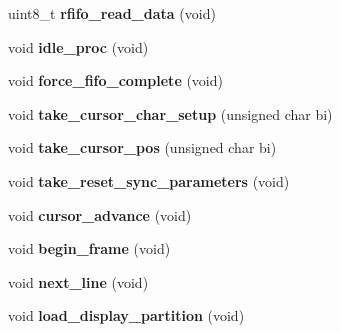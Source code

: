 \begin{DoxyCompactItemize}
\item 
\hypertarget{structPC98__GDC__state_a7d6b362a6b895d3a1e7636de691e0e00}{uint8\-\_\-t {\bfseries rfifo\-\_\-read\-\_\-data} (void)}\label{structPC98__GDC__state_a7d6b362a6b895d3a1e7636de691e0e00}

\item 
\hypertarget{structPC98__GDC__state_a0ccae08dcb56ec0101cc2d4cfd157eb1}{void {\bfseries idle\-\_\-proc} (void)}\label{structPC98__GDC__state_a0ccae08dcb56ec0101cc2d4cfd157eb1}

\item 
\hypertarget{structPC98__GDC__state_ae84ccc228e028cda626d6daf99f87838}{void {\bfseries force\-\_\-fifo\-\_\-complete} (void)}\label{structPC98__GDC__state_ae84ccc228e028cda626d6daf99f87838}

\item 
\hypertarget{structPC98__GDC__state_a6ba4e40ce3639a48cfbadba1872df0d0}{void {\bfseries take\-\_\-cursor\-\_\-char\-\_\-setup} (unsigned char bi)}\label{structPC98__GDC__state_a6ba4e40ce3639a48cfbadba1872df0d0}

\item 
\hypertarget{structPC98__GDC__state_a80e0ea7ab57f9fc28dd8bd1f50d71be1}{void {\bfseries take\-\_\-cursor\-\_\-pos} (unsigned char bi)}\label{structPC98__GDC__state_a80e0ea7ab57f9fc28dd8bd1f50d71be1}

\item 
\hypertarget{structPC98__GDC__state_af2b09ec20b24e73d7db449705d1f2ec8}{void {\bfseries take\-\_\-reset\-\_\-sync\-\_\-parameters} (void)}\label{structPC98__GDC__state_af2b09ec20b24e73d7db449705d1f2ec8}

\item 
\hypertarget{structPC98__GDC__state_a391cd10c2a662e20d413727c48000af3}{void {\bfseries cursor\-\_\-advance} (void)}\label{structPC98__GDC__state_a391cd10c2a662e20d413727c48000af3}

\item 
\hypertarget{structPC98__GDC__state_ac85b9bb3a3bbd0b4f66de944483d8424}{void {\bfseries begin\-\_\-frame} (void)}\label{structPC98__GDC__state_ac85b9bb3a3bbd0b4f66de944483d8424}

\item 
\hypertarget{structPC98__GDC__state_ab65b859c51a1a67e418519493d965cf2}{void {\bfseries next\-\_\-line} (void)}\label{structPC98__GDC__state_ab65b859c51a1a67e418519493d965cf2}

\item 
\hypertarget{structPC98__GDC__state_abda2457b69d686010fc4f31761c06a67}{void {\bfseries load\-\_\-display\-\_\-partition} (void)}\label{structPC98__GDC__state_abda2457b69d686010fc4f31761c06a67}


\end{DoxyCompactItemize}
